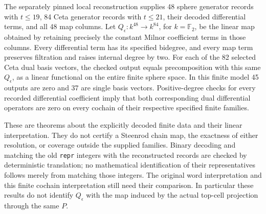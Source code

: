 \begin{lemma}
  \label{lem:lin-naturality-batch21-cochains}
  \leanok
  The separately pinned local reconstruction supplies 48 sphere generator
  records with $t\le19$, 84 Ceta generator records with $t\le21$, their
  decoded differential terms, and all 48 map columns. Let
  $Q_\epsilon:k^{48}\to k^{84}$, for $k=\mathbb F_2$, be the linear map
  obtained by retaining precisely the constant Milnor coefficient terms
  in those columns. Every differential term has its specified bidegree,
  and every map term preserves filtration and raises internal degree by two.
  For each of the 82 selected Ceta dual basis vectors,
  the checked output equals precomposition with this same $Q_\epsilon$,
  as a linear functional on the entire finite sphere space.
  In this finite model 45 outputs are zero and 37 are single basis vectors.
  Positive-degree checks for every recorded differential coefficient
  imply that both corresponding dual differential operators are zero on
  every cochain of their respective specified finite families.

  These are theorems about the explicitly decoded finite data and their
  linear interpretation. They do not certify a Steenrod chain map, the
  exactness of either resolution, or coverage outside the supplied families.
  Binary decoding and matching the old \texttt{repr} integers with the
  reconstructed records are checked by deterministic translation; no
  mathematical identification of their representatives follows merely
  from matching those integers. The original word interpretation and
  this finite cochain interpretation still need their comparison.
  In particular these results do not identify $Q_\epsilon$ with the map
  induced by the actual top-cell projection through the same $P$.
\end{lemma}
